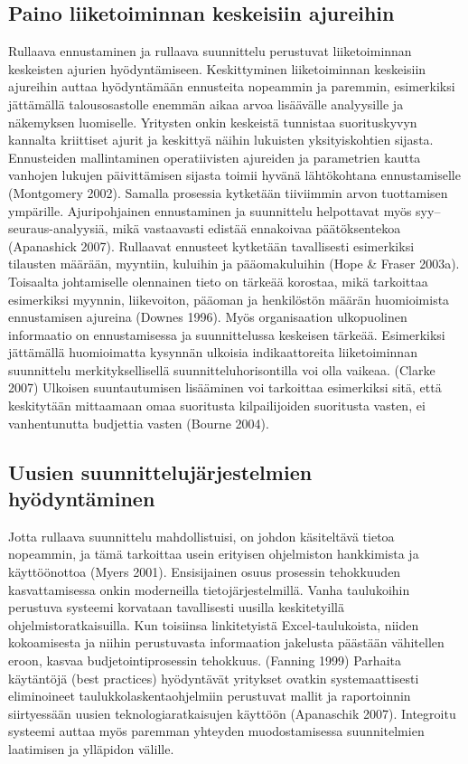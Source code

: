 \documentclass[12pt,a4paper,oneside,pdftex]{report}
\begin{document}
\subsection{Paino liiketoiminnan keskeisiin ajureihin}

Rullaava ennustaminen ja rullaava suunnittelu perustuvat liiketoiminnan keskeisten ajurien hyödyntämiseen. Keskittyminen liiketoiminnan keskeisiin ajureihin auttaa hyödyntämään ennusteita nopeammin ja paremmin, esimerkiksi jättämällä talousosastolle enemmän aikaa arvoa lisäävälle analyysille ja näkemyksen luomiselle. Yritysten onkin keskeistä tunnistaa suorituskyvyn kannalta kriittiset ajurit ja keskittyä näihin lukuisten yksityiskohtien sijasta. Ennusteiden mallintaminen operatiivisten ajureiden ja parametrien kautta vanhojen lukujen päivittämisen sijasta toimii hyvänä lähtökohtana ennustamiselle (Montgomery 2002). Samalla prosessia kytketään tiiviimmin arvon tuottamisen ympärille. Ajuripohjainen ennustaminen ja suunnittelu helpottavat myös syy–seuraus-analyysiä, mikä vastaavasti edistää ennakoivaa päätöksentekoa (Apanashick 2007). Rullaavat ennusteet kytketään tavallisesti esimerkiksi tilausten määrään, myyntiin, kuluihin ja pääomakuluihin (Hope & Fraser 2003a). Toisaalta johtamiselle olennainen tieto on tärkeää korostaa, mikä tarkoittaa esimerkiksi myynnin, liikevoiton, pääoman ja henkilöstön määrän huomioimista ennustamisen ajureina (Downes 1996). Myös organisaation ulkopuolinen informaatio on ennustamisessa ja suunnittelussa keskeisen tärkeää. Esimerkiksi jättämällä huomioimatta kysynnän ulkoisia indikaattoreita liiketoiminnan suunnittelu merkityksellisellä suunnitteluhorisontilla voi olla vaikeaa. (Clarke 2007) Ulkoisen suuntautumisen lisääminen voi tarkoittaa esimerkiksi sitä, että keskitytään mittaamaan omaa suoritusta kilpailijoiden suoritusta vasten, ei vanhentunutta budjettia vasten (Bourne 2004).

\subsection{Uusien suunnittelujärjestelmien hyödyntäminen}

Jotta rullaava suunnittelu mahdollistuisi, on johdon käsiteltävä tietoa nopeammin, ja tämä tarkoittaa usein erityisen ohjelmiston hankkimista ja käyttöönottoa (Myers 2001). Ensisijainen osuus prosessin tehokkuuden kasvattamisessa onkin moderneilla tietojärjestelmillä. Vanha taulukoihin perustuva systeemi korvataan tavallisesti uusilla keskitetyillä ohjelmistoratkaisuilla. Kun toisiinsa linkitetyistä Excel-taulukoista, niiden kokoamisesta ja niihin perustuvasta informaation jakelusta päästään vähitellen eroon, kasvaa budjetointiprosessin tehokkuus. (Fanning 1999) Parhaita käytäntöjä (best practices) hyödyntävät yritykset ovatkin systemaattisesti eliminoineet taulukkolaskentaohjelmiin perustuvat mallit ja raportoinnin siirtyessään uusien teknologiaratkaisujen käyttöön (Apanaschik 2007). Integroitu systeemi auttaa myös paremman yhteyden muodostamisessa suunnitelmien laatimisen ja ylläpidon välille.
\end{document}
